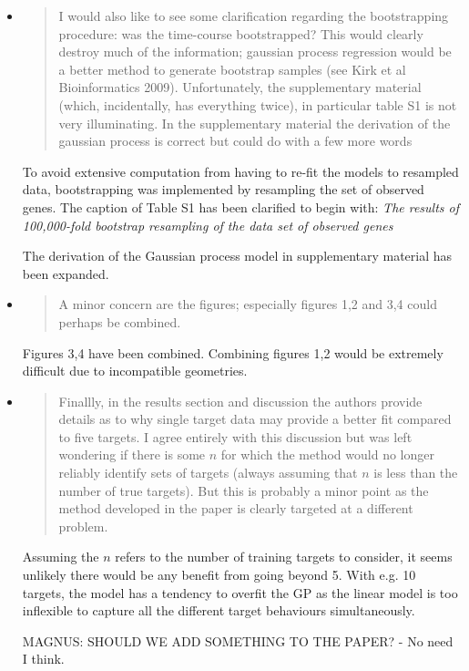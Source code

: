 \documentclass{article}
\begin{document}
\begin{itemize}
\item \begin{quote} I would also like to see some clarification
    regarding the bootstrapping procedure: was the time-course
    bootstrapped? This would clearly destroy much of the information;
    gaussian process regression would be a better method to generate
    bootstrap samples (see Kirk et al Bioinformatics
    2009). Unfortunately, the supplementary material (which,
    incidentally, has everything twice), in particular table S1 is not
    very illuminating. In the supplementary material the derivation of
    the gaussian process is correct but could do with a few more words
  \end{quote}

To avoid extensive computation from having to re-fit the models to
resampled data, bootstrapping was implemented by resampling the set
of observed genes.  The caption of Table S1 has been clarified
to begin with:
\emph{The results of 100,000-fold bootstrap resampling of
the data set of observed genes}

The derivation of the Gaussian process model in supplementary material
has been expanded.

\item \begin{quote} A minor concern are the figures; especially
    figures 1,2 and 3,4 could perhaps be combined.
  \end{quote}

  Figures 3,4 have been combined. Combining figures 1,2 would be
  extremely difficult due to incompatible geometries.

\item \begin{quote} Finallly, in the results section and discussion
    the authors provide details as to why single target data may
    provide a better fit compared to five targets. I agree entirely
    with this discussion but was left wondering if there is some $n$
    for which the method would no longer reliably identify sets of
    targets (always assuming that $n$ is less than the number of true
    targets). But this is probably a minor point as the method
    developed in the paper is clearly targeted at a different problem.
  \end{quote}

  Assuming the $n$ refers to the number of training targets to
  consider, it seems unlikely there would be any benefit from going
  beyond 5.  With e.g. 10 targets, the model has a tendency to overfit
  the GP as the linear model is too inflexible to capture all the
  different target behaviours simultaneously.

  MAGNUS: SHOULD WE ADD SOMETHING TO THE PAPER? - No need I think.

\end{itemize}
\end{document}
